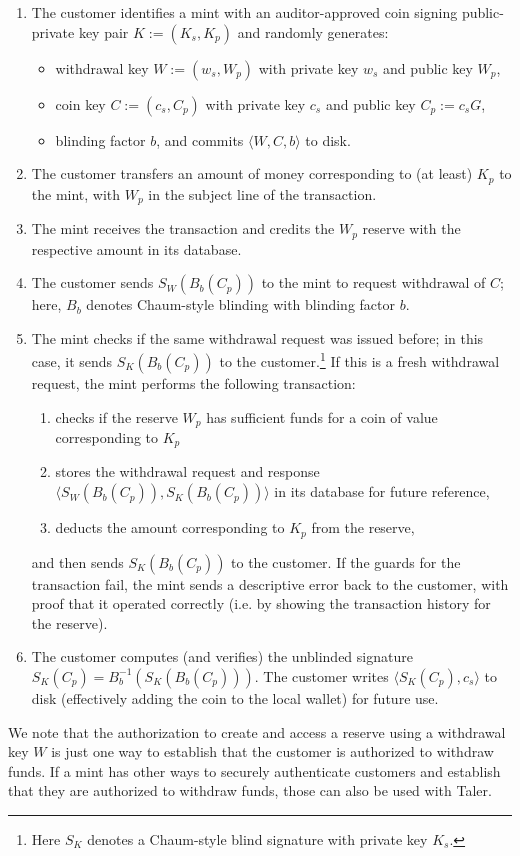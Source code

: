 \documentclass{llncs}
\begin{document}
\begin{enumerate}
  \item The customer identifies a mint with an auditor-approved
        coin signing public-private key pair $K := (K_s, K_p)$
        and randomly generates:
        \begin{itemize}
           \item withdrawal key $W := (w_s,W_p)$ with private key $w_s$ and public key $W_p$,
           \item coin key $C := (c_s,C_p)$ with private key $c_s$ and public key $C_p := c_s G$,
           \item blinding factor $b$, and commits $\langle W, C, b \rangle$ to disk.
        \end{itemize}
  \item The customer transfers an amount of money corresponding to (at least) $K_p$ to the mint, with $W_p$ in the subject line of the transaction.
  \item The mint receives the transaction and credits the $W_p$ reserve with the respective amount in its database.
  \item The customer sends $S_W(B_b(C_p))$ to the mint to request withdrawal of $C$; here, $B_b$ denotes Chaum-style blinding with blinding factor $b$.
  \item The mint checks if the same withdrawal request was issued before; in this case, it sends $S_{K}(B_b(C_p))$ to the customer.\footnote{Here $S_K$
        denotes a Chaum-style blind signature with private key $K_s$.}
        If this is a fresh withdrawal request, the mint performs the following transaction:
        \begin{enumerate}
           \item checks if the reserve $W_p$ has sufficient funds for a coin of value corresponding to $K_p$
           \item stores the withdrawal request and response $\langle S_W(B_b(C_p)), S_K(B_b(C_p)) \rangle$ in its database for future reference,
           \item deducts the amount corresponding to $K_p$ from the reserve,
        \end{enumerate}
        and then sends $S_{K}(B_b(C_p))$ to the customer.
        If the guards for the transaction fail, the mint sends a descriptive error back to the customer,
        with proof that it operated correctly (i.e. by showing the transaction history for the reserve).
  \item The customer computes (and verifies) the unblinded signature $S_K(C_p) = B^{-1}_b(S_K(B_b(C_p)))$.
        The customer writes $\langle S_K(C_p), c_s \rangle$ to disk (effectively adding the coin to the
        local wallet) for future use.
\end{enumerate}
We note that the authorization to create and access a reserve using a
withdrawal key $W$ is just one way to establish that the customer is
authorized to withdraw funds.  If a mint has other ways to securely
authenticate customers and establish that they are authorized to
withdraw funds, those can also be used with Taler.
\end{document}
